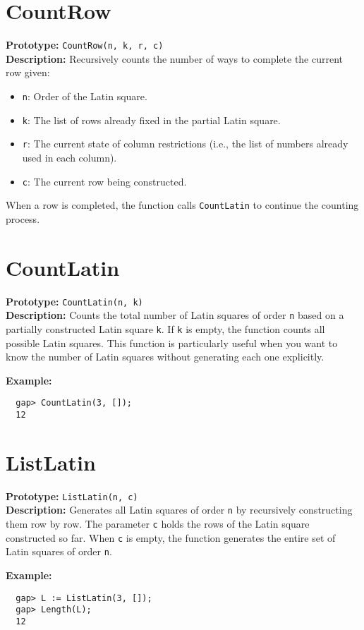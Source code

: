 \documentclass{report}
\begin{document}
\section{CountRow}
\textbf{Prototype:} \texttt{CountRow(n, k, r, c)}\\[1mm]
\textbf{Description:}  
Recursively counts the number of ways to complete the current row given:
\begin{itemize}
  \item \texttt{n}: Order of the Latin square.
  \item \texttt{k}: The list of rows already fixed in the partial Latin square.
  \item \texttt{r}: The current state of column restrictions (i.e., the list of numbers already used in each column).
  \item \texttt{c}: The current row being constructed.
\end{itemize}
When a row is completed, the function calls \texttt{CountLatin} to continue the counting process.

\section{CountLatin}
\textbf{Prototype:} \texttt{CountLatin(n, k)}\\[1mm]
\textbf{Description:}  
Counts the total number of Latin squares of order \texttt{n} based on a partially constructed Latin square \texttt{k}. If \texttt{k} is empty, the function counts all possible Latin squares. This function is particularly useful when you want to know the number of Latin squares without generating each one explicitly.

\textbf{Example:}
\begin{verbatim}
  gap> CountLatin(3, []);
  12
\end{verbatim}

\section{ListLatin}
\textbf{Prototype:} \texttt{ListLatin(n, c)}\\[1mm]
\textbf{Description:}  
Generates all Latin squares of order \texttt{n} by recursively constructing them row by row. The parameter \texttt{c} holds the rows of the Latin square constructed so far. When \texttt{c} is empty, the function generates the entire set of Latin squares of order \texttt{n}.

\textbf{Example:}
\begin{verbatim}
  gap> L := ListLatin(3, []);
  gap> Length(L);
  12
\end{verbatim}
\end{document}
